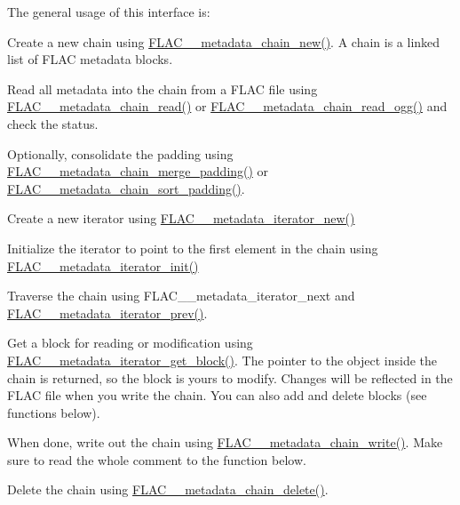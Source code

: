 The general usage of this interface is\+:


\begin{DoxyItemize}
\item Create a new chain using \mbox{\hyperlink{group__flac__metadata__level2_gafd1f4f58af29325b067ebc5dc34a0f69}{F\+L\+A\+C\+\_\+\+\_\+metadata\+\_\+chain\+\_\+new()}}. A chain is a linked list of F\+L\+AC metadata blocks.
\item Read all metadata into the chain from a F\+L\+AC file using \mbox{\hyperlink{group__flac__metadata__level2_gadb7d8e9a82aeb43e256f0a948adf5c45}{F\+L\+A\+C\+\_\+\+\_\+metadata\+\_\+chain\+\_\+read()}} or \mbox{\hyperlink{group__flac__metadata__level2_gae7b34f2929bedea0e14ac14aca253a40}{F\+L\+A\+C\+\_\+\+\_\+metadata\+\_\+chain\+\_\+read\+\_\+ogg()}} and check the status.
\item Optionally, consolidate the padding using \mbox{\hyperlink{group__flac__metadata__level2_gab24934bc1f0e054c631a22c9b9221f3e}{F\+L\+A\+C\+\_\+\+\_\+metadata\+\_\+chain\+\_\+merge\+\_\+padding()}} or \mbox{\hyperlink{group__flac__metadata__level2_gaa14304da1c8e706808cfafa5cbbf575b}{F\+L\+A\+C\+\_\+\+\_\+metadata\+\_\+chain\+\_\+sort\+\_\+padding()}}.
\item Create a new iterator using \mbox{\hyperlink{group__flac__metadata__level2_gac988906d63bd2ddc910d8f0b118591f7}{F\+L\+A\+C\+\_\+\+\_\+metadata\+\_\+iterator\+\_\+new()}}
\item Initialize the iterator to point to the first element in the chain using \mbox{\hyperlink{group__flac__metadata__level2_ga4a5af69a1f19436b02f738eb8c97c959}{F\+L\+A\+C\+\_\+\+\_\+metadata\+\_\+iterator\+\_\+init()}}
\item Traverse the chain using F\+L\+A\+C\+\_\+\+\_\+metadata\+\_\+iterator\+\_\+next and \mbox{\hyperlink{group__flac__metadata__level2_ga003373a88bea6cea2df32f110a95e912}{F\+L\+A\+C\+\_\+\+\_\+metadata\+\_\+iterator\+\_\+prev()}}.
\item Get a block for reading or modification using \mbox{\hyperlink{group__flac__metadata__level2_ga4a2b00a4312d178a9f55c2e2f8b08904}{F\+L\+A\+C\+\_\+\+\_\+metadata\+\_\+iterator\+\_\+get\+\_\+block()}}. The pointer to the object inside the chain is returned, so the block is yours to modify. Changes will be reflected in the F\+L\+AC file when you write the chain. You can also add and delete blocks (see functions below).
\item When done, write out the chain using \mbox{\hyperlink{group__flac__metadata__level2_gaa15ead7230217de8e79f4af822cda490}{F\+L\+A\+C\+\_\+\+\_\+metadata\+\_\+chain\+\_\+write()}}. Make sure to read the whole comment to the function below.
\item Delete the chain using \mbox{\hyperlink{group__flac__metadata__level2_ga178898eef72ba9d569b1964fffcb4a8b}{F\+L\+A\+C\+\_\+\+\_\+metadata\+\_\+chain\+\_\+delete()}}.
\end{DoxyItemize}

